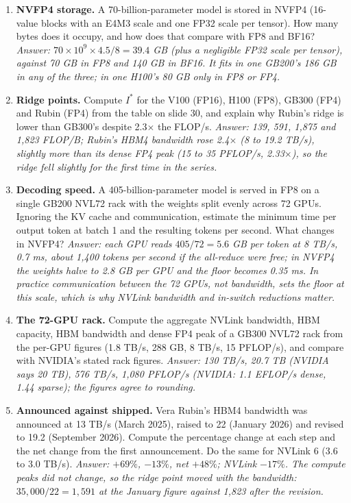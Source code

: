 \documentclass[11pt,letterpaper]{article}
\begin{document}
\begin{enumerate}[leftmargin=1.6em,itemsep=6pt]
\item \textbf{NVFP4 storage.} A 70-billion-parameter model is stored in NVFP4 (16-value blocks with an E4M3 scale and one FP32 scale per tensor). How many bytes does it occupy, and how does that compare with FP8 and BF16? \emph{Answer: $70\times 10^9\times 4.5/8 = 39.4$ GB (plus a negligible FP32 scale per tensor), against 70 GB in FP8 and 140 GB in BF16. It fits in one GB200's 186 GB in any of the three; in one H100's 80 GB only in FP8 or FP4.}
\item \textbf{Ridge points.} Compute $I^\ast$ for the V100 (FP16), H100 (FP8), GB300 (FP4) and Rubin (FP4) from the table on slide 30, and explain why Rubin's ridge is lower than GB300's despite 2.3$\times$ the FLOP/s. \emph{Answer: 139, 591, 1{,}875 and 1{,}823 FLOP/B; Rubin's HBM4 bandwidth rose 2.4$\times$ (8 to 19.2 TB/s), slightly more than its dense FP4 peak (15 to 35 PFLOP/s, 2.33$\times$), so the ridge fell slightly for the first time in the series.}
\item \textbf{Decoding speed.} A 405-billion-parameter model is served in FP8 on a single GB200 NVL72 rack with the weights split evenly across 72 GPUs. Ignoring the KV cache and communication, estimate the minimum time per output token at batch 1 and the resulting tokens per second. What changes in NVFP4? \emph{Answer: each GPU reads $405/72 = 5.6$ GB per token at 8 TB/s, 0.7 ms, about 1{,}400 tokens per second if the all-reduce were free; in NVFP4 the weights halve to 2.8 GB per GPU and the floor becomes 0.35 ms. In practice communication between the 72 GPUs, not bandwidth, sets the floor at this scale, which is why NVLink bandwidth and in-switch reductions matter.}
\item \textbf{The 72-GPU rack.} Compute the aggregate NVLink bandwidth, HBM capacity, HBM bandwidth and dense FP4 peak of a GB300 NVL72 rack from the per-GPU figures (1.8 TB/s, 288 GB, 8 TB/s, 15 PFLOP/s), and compare with NVIDIA's stated rack figures. \emph{Answer: 130 TB/s, 20.7 TB (NVIDIA says 20 TB), 576 TB/s, 1{,}080 PFLOP/s (NVIDIA: 1.1 EFLOP/s dense, 1.44 sparse); the figures agree to rounding.}
\item \textbf{Announced against shipped.} Vera Rubin's HBM4 bandwidth was announced at 13 TB/s (March 2025), raised to 22 (January 2026) and revised to 19.2 (September 2026). Compute the percentage change at each step and the net change from the first announcement. Do the same for NVLink 6 (3.6 to 3.0 TB/s). \emph{Answer: $+69\%$, $-13\%$, net $+48\%$; NVLink $-17\%$. The compute peaks did not change, so the ridge point moved with the bandwidth: $35{,}000/22 = 1{,}591$ at the January figure against 1{,}823 after the revision.}

\end{enumerate}
\end{document}
